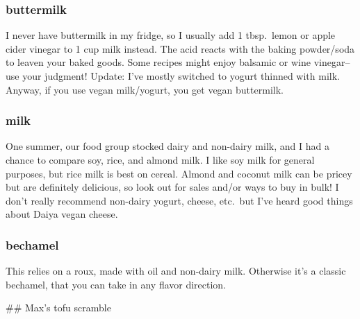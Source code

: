 \subsubsection{buttermilk}
I never have buttermilk in my fridge, so I usually add 1 tbsp.\ lemon or apple cider vinegar to 1 cup milk instead. The acid reacts with the baking powder/soda to leaven your baked goods. Some recipes might enjoy balsamic or wine vinegar--use your judgment! Update: I've mostly switched to yogurt thinned with milk. Anyway, if you use vegan milk/yogurt, you get vegan buttermilk.

\subsubsection{milk}
One summer, our food group stocked dairy and non-dairy milk, and I had a chance to compare soy, rice, and almond milk. I like soy milk for general purposes, but rice milk is best on cereal. Almond and coconut milk can be pricey but are definitely delicious, so look out for sales and/or ways to buy in bulk! I don't really recommend non-dairy yogurt, cheese, etc.\ but I've heard good things about Daiya vegan cheese.

\subsubsection{bechamel}
This relies on a roux, made with oil and non-dairy milk. Otherwise it's a classic bechamel, that you can take in any flavor direction.

## Max's tofu scramble

